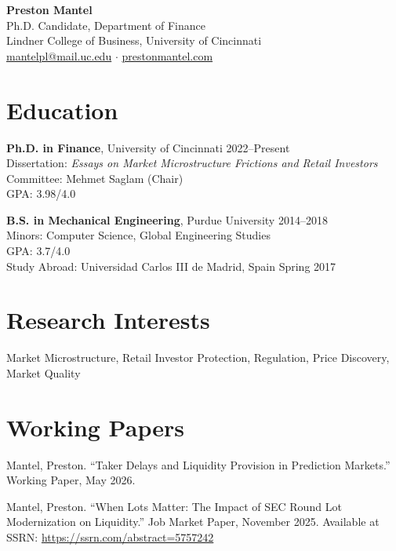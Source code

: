 \documentclass[11pt]{article}
\begin{document}
\begin{center}
  {\LARGE\bfseries Preston Mantel}\\[4pt]
  Ph.D. Candidate, Department of Finance\\
  Lindner College of Business, University of Cincinnati\\[3pt]
  \href{mailto:mantelpl@mail.uc.edu}{mantelpl@mail.uc.edu} \quad$\cdot$\quad
  \href{https://prestonmantel.com}{prestonmantel.com}
\end{center}

\section*{Education}

\noindent\textbf{Ph.D. in Finance}, University of Cincinnati \hfill 2022--Present \\
Dissertation: \textit{Essays on Market Microstructure Frictions and Retail Investors} \\
Committee: Mehmet Saglam (Chair) \\
GPA: 3.98/4.0

\vspace{6pt}
\noindent\textbf{B.S. in Mechanical Engineering}, Purdue University \hfill 2014--2018 \\
Minors: Computer Science, Global Engineering Studies \\
GPA: 3.7/4.0 \\
Study Abroad: Universidad Carlos III de Madrid, Spain \hfill Spring 2017

\section*{Research Interests}

\noindent Market Microstructure, Retail Investor Protection, Regulation, Price Discovery, Market Quality

\section*{Working Papers}

\noindent Mantel, Preston. ``Taker Delays and Liquidity Provision in Prediction Markets.'' Working Paper, May 2026.

\vspace{6pt}
\noindent Mantel, Preston. ``When Lots Matter: The Impact of SEC Round Lot Modernization on Liquidity.'' Job Market Paper, November 2025. Available at SSRN: \url{https://ssrn.com/abstract=5757242}
\end{document}
